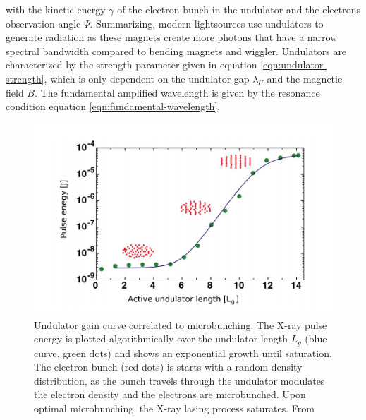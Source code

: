 with the kinetic energy $\gamma$ of the electron bunch in the undulator and the electrons observation angle $\Psi$. Summarizing, modern lightsources use undulators to generate radiation as these magnets create more photons that have a narrow spectral bandwidth compared to bending magnets and wiggler. Undulators are characterized by the strength parameter given in equation \ref{eqn:undulator-strength}, which is only dependent on the undulator gap $\lambda_{U}$ and the magnetic field $B$. The fundamental amplified wavelength is given by the resonance condition equation \ref{eqn:fundamental-wavelength}.\\
\begin{figure}
	\centering
		\includegraphics[width=1.00\textwidth]{images/gain-length.JPG}
	\caption[Undulator gain curve correlated to microbunching.]{Undulator gain curve correlated to microbunching. The X-ray pulse energy is plotted algorithmically over the undulator length $L_{g}$ (blue curve, green dots) and shows an exponential growth until saturation. The electron bunch (red dots) is starts with a random density distribution, as the bunch travels through the undulator modulates the electron density and the electrons are microbunched. Upon optimal microbunching, the X-ray lasing process saturates. From \citep{Rupp-2013-Thesis,Rupp-2016-Springer}}
	\label{fig:gain-length}
\end{figure}
